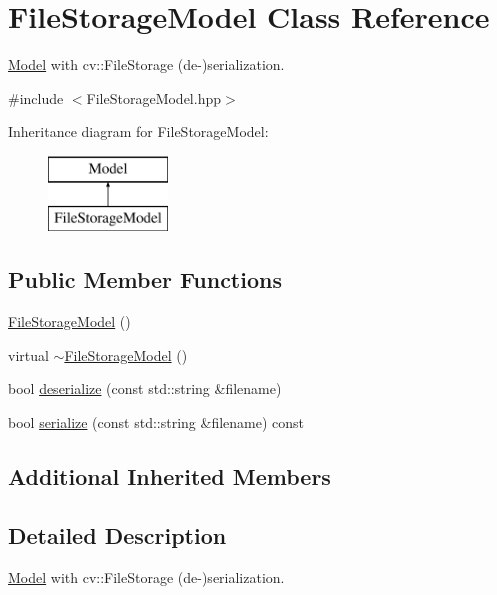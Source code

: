 \hypertarget{classFileStorageModel}{\section{File\-Storage\-Model Class Reference}
\label{classFileStorageModel}
}


\hyperlink{classModel}{Model} with cv\-::\-File\-Storage (de-\/)serialization.  




{\ttfamily \#include $<$File\-Storage\-Model.\-hpp$>$}

Inheritance diagram for File\-Storage\-Model\-:\begin{figure}[H]
\begin{center}
\leavevmode
\includegraphics[height=2.000000cm]{classFileStorageModel}
\end{center}
\end{figure}
\subsection*{Public Member Functions}
\begin{DoxyCompactItemize}
\item 
\hyperlink{classFileStorageModel_a4a9563fed1ae1a659466d64ee8890653}{File\-Storage\-Model} ()
\item 
virtual \hyperlink{classFileStorageModel_aba448d7c91c33e63cdfc95c8580fd834}{$\sim$\-File\-Storage\-Model} ()
\item 
bool \hyperlink{classFileStorageModel_af97e8cf0ced06893ffca6ec119a31143}{deserialize} (const std\-::string \&filename)
\item 
bool \hyperlink{classFileStorageModel_acc945cf6792663f84f1302e926dca63d}{serialize} (const std\-::string \&filename) const 
\end{DoxyCompactItemize}
\subsection*{Additional Inherited Members}


\subsection{Detailed Description}
\hyperlink{classModel}{Model} with cv\-::\-File\-Storage (de-\/)serialization. 

